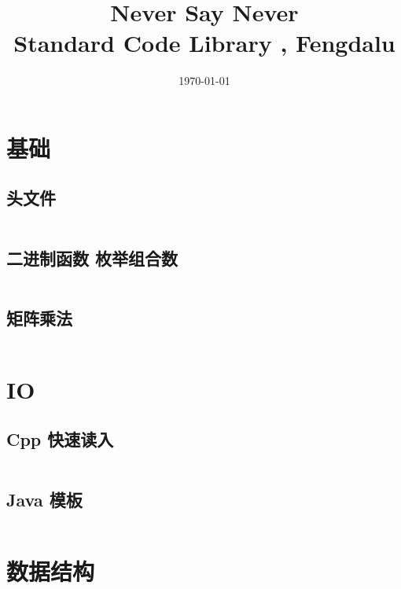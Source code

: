 \documentclass[titlepage,landscape,a4paper,10pt]{article}
\title{\LARGE{Never Say Never} \\
[2ex] \Large{Standard Code Library , Fengdalu} }
\date{\today}
\begin{document}
\maketitle

\begin{multicols*}{2}

    \begin{spacing}{0}
        \tableofcontents
    \end{spacing}
\end{multicols*}

\begin{multicols}{2}

\newpage
\begin{spacing}{0.8}

\section{基础}

\subsection{头文件}
\inputminted{cpp}{Basic/headers.cpp}

\subsection{二进制函数 枚举组合数}
\inputminted{cpp}{Basic/枚举组合.cpp}

\subsection{矩阵乘法}
\inputminted{cpp}{Basic/Matrix.cpp}

\section{IO}

\subsection{Cpp 快速读入}
\inputminted{cpp}{IO/fastio.cpp}

\subsection{Java 模板}
\inputminted{java}{IO/Main.java}

\section{数据结构}


\end{spacing}
\end{multicols}
\end{document}
